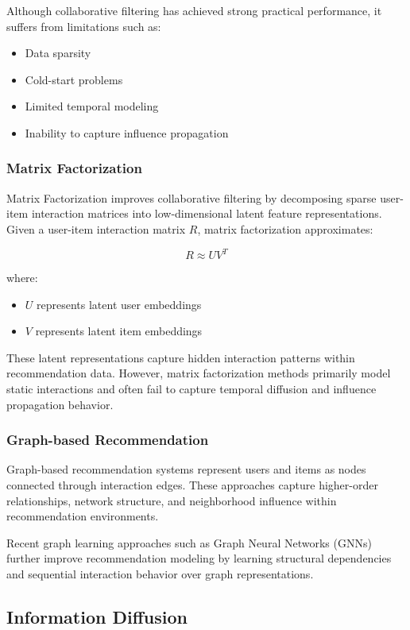 \documentclass{article}
\begin{document}
Although collaborative filtering has achieved strong practical performance, it suffers from limitations such as:
\begin{itemize}
\item Data sparsity
\item Cold-start problems
\item Limited temporal modeling
\item Inability to capture influence propagation
\end{itemize}

\subsubsection{Matrix Factorization}

Matrix Factorization improves collaborative filtering by decomposing sparse user-item interaction matrices into low-dimensional latent feature representations. Given a user-item interaction matrix \(R\), matrix factorization approximates:

\[
R \approx UV^T
\]

where:
\begin{itemize}
\item \(U\) represents latent user embeddings
\item \(V\) represents latent item embeddings
\end{itemize}

These latent representations capture hidden interaction patterns within recommendation data. However, matrix factorization methods primarily model static interactions and often fail to capture temporal diffusion and influence propagation behavior.

\subsubsection{Graph-based Recommendation}

Graph-based recommendation systems represent users and items as nodes connected through interaction edges. These approaches capture higher-order relationships, network structure, and neighborhood influence within recommendation environments.

Recent graph learning approaches such as Graph Neural Networks (GNNs) further improve recommendation modeling by learning structural dependencies and sequential interaction behavior over graph representations.

\subsection{Information Diffusion}
\end{document}
